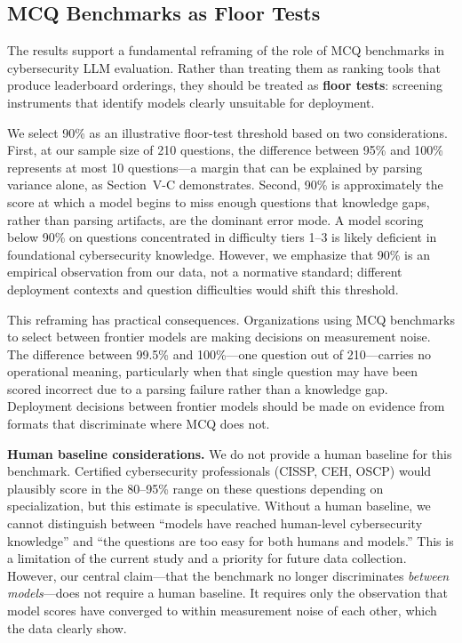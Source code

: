 \documentclass[journal]{IEEEtran}
\begin{document}
\subsection{MCQ Benchmarks as Floor Tests}

The results support a fundamental reframing of the role of MCQ benchmarks in cybersecurity LLM evaluation. Rather than treating them as ranking tools that produce leaderboard orderings, they should be treated as \textbf{floor tests}: screening instruments that identify models clearly unsuitable for deployment.

We select 90\% as an illustrative floor-test threshold based on two considerations. First, at our sample size of 210 questions, the difference between 95\% and 100\% represents at most 10 questions---a margin that can be explained by parsing variance alone, as Section~V-C demonstrates. Second, 90\% is approximately the score at which a model begins to miss enough questions that knowledge gaps, rather than parsing artifacts, are the dominant error mode. A model scoring below 90\% on questions concentrated in difficulty tiers 1--3 is likely deficient in foundational cybersecurity knowledge. However, we emphasize that 90\% is an empirical observation from our data, not a normative standard; different deployment contexts and question difficulties would shift this threshold.

This reframing has practical consequences. Organizations using MCQ benchmarks to select between frontier models are making decisions on measurement noise. The difference between 99.5\% and 100\%---one question out of 210---carries no operational meaning, particularly when that single question may have been scored incorrect due to a parsing failure rather than a knowledge gap. Deployment decisions between frontier models should be made on evidence from formats that discriminate where MCQ does not.

\textbf{Human baseline considerations.} We do not provide a human baseline for this benchmark. Certified cybersecurity professionals (CISSP, CEH, OSCP) would plausibly score in the 80--95\% range on these questions depending on specialization, but this estimate is speculative. Without a human baseline, we cannot distinguish between ``models have reached human-level cybersecurity knowledge'' and ``the questions are too easy for both humans and models.'' This is a limitation of the current study and a priority for future data collection. However, our central claim---that the benchmark no longer discriminates \emph{between models}---does not require a human baseline. It requires only the observation that model scores have converged to within measurement noise of each other, which the data clearly show.
\end{document}
